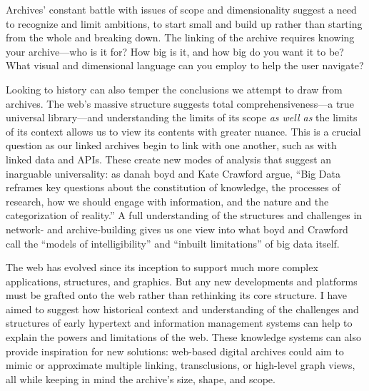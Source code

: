 Archives' constant battle with issues of scope and dimensionality suggest a need to recognize and limit ambitions, to start small and build up rather than starting from the whole and breaking down. The linking of the archive requires knowing your archive---who is it for? How big is it, and how big do you want it to be? What visual and dimensional language can you employ to help the user navigate?

Looking to history can also temper the conclusions we attempt to draw from archives. The web's massive structure suggests total comprehensiveness---a true universal library---and understanding the limits of its scope \emph{as well as} the limits of its context allows us to view its contents with greater nuance. This is a crucial question as our linked archives begin to link with one another, such as with linked data and APIs. These create new modes of analysis that suggest an inarguable universality: as danah boyd and Kate Crawford argue, ``Big Data reframes key questions about the constitution of knowledge, the processes of research, how we should engage with information, and the nature and the categorization of reality.''\autocite{boyd_critical_2012} A full understanding of the structures and challenges in network- and archive-building gives us one view into what boyd and Crawford call the ``models of intelligibility'' and ``inbuilt limitations'' of big data itself.

The web has evolved since its inception to support much more complex applications, structures, and graphics. But any new developments and platforms must be grafted onto the web rather than rethinking its core structure. I have aimed to suggest how historical context and understanding of the challenges and structures of early hypertext and information management systems can help to explain the powers and limitations of the web. These knowledge systems can also provide inspiration for new solutions: web-based digital archives could aim to mimic or approximate multiple linking, transclusions, or high-level graph views, all while keeping in mind the archive's size, shape, and scope.
